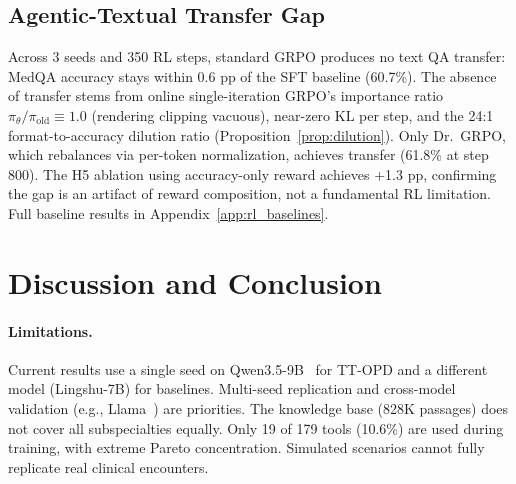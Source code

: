 \documentclass{article}
\begin{document}
\subsection{Agentic-Textual Transfer Gap}
\label{sec:transfer}

Across 3 seeds and 350 RL steps, standard GRPO produces no text QA transfer: MedQA accuracy stays within 0.6 pp of the SFT baseline (60.7\%). The absence of transfer stems from online single-iteration GRPO's importance ratio $\pi_\theta/\pi_\text{old} \equiv 1.0$ (rendering clipping vacuous), near-zero KL per step, and the 24:1 format-to-accuracy dilution ratio (Proposition~\ref{prop:dilution}). Only Dr.~GRPO, which rebalances via per-token normalization, achieves transfer (61.8\% at step 800). The H5 ablation using accuracy-only reward achieves +1.3 pp, confirming the gap is an artifact of reward composition, not a fundamental RL limitation. Full baseline results in Appendix~\ref{app:rl_baselines}.


\section{Discussion and Conclusion}
\label{sec:discussion}

\paragraph{Limitations.} Current results use a single seed on Qwen3.5-9B~\citep{yang2024qwen25} for TT-OPD and a different model (Lingshu-7B) for baselines. Multi-seed replication and cross-model validation (e.g., Llama~\citep{touvron2023llama}) are priorities. The knowledge base (828K passages) does not cover all subspecialties equally. Only 19 of 179 tools (10.6\%) are used during training, with extreme Pareto concentration. Simulated scenarios cannot fully replicate real clinical encounters.
\end{document}
